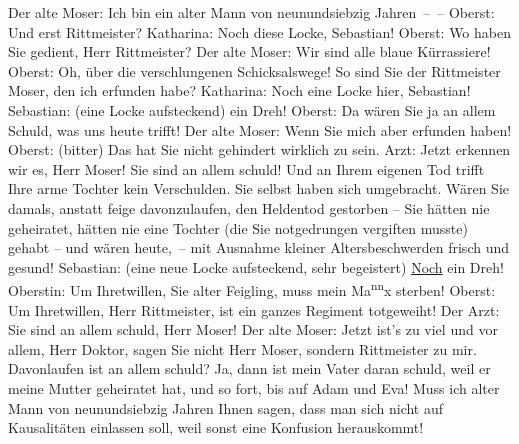 \begin{ledgroupsized}[t]{13cm}
           \pstart
           Der alte Moser: Ich bin ein alter Mann von neunundsiebzig Jahren – –\pend
           \pstart
           {\pb}Oberst: Und erst Rittmeister?\pend
           \pstart
           Katharina: Noch diese Locke, Sebastian!\pend
           \pstart
           Oberst: Wo haben Sie gedient, Herr Rittmeister?\pend
           \pstart
           Der alte Moser: Wir sind alle blaue Kürrassiere!\pend
           \pstart
           Oberst: Oh, über die verschlungenen Schicksalswege! So sind Sie der Rittmeister
               Moser, den ich erfunden habe?\pend
           \pstart
           Katharina: Noch eine Locke hier, Sebastian!\pend
           \pstart
           Sebastian: (eine Locke aufsteckend)  ein Dreh!\pend
           \pstart
           Oberst: Da wären Sie ja an allem Schuld, was uns heute trifft!\pend
           \pstart
           \introOben{}\introOben{}Der alte Moser: Wenn Sie mich aber erfunden haben!\pend
           \pstart
           Oberst: (bitter) Das hat Sie nicht gehindert wirklich zu sein.\pend
           \pstart
           Arzt: Jetzt erkennen wir es, Herr Moser! Sie sind an allem schuld! Und an Ihrem
               eigenen Tod trifft Ihre arme Tochter kein Verschulden. Sie selbst haben sich
               umgebracht. Wären Sie damals, anstatt feige davonzulaufen, den Heldentod gestorben –
               Sie hätten nie geheiratet, hätten nie eine Tochter (die Sie notgedrungen vergiften
               musste) gehabt – und wären heute, – mit Ausnahme kleiner Altersbeschwerden frisch und
               gesund!\pend
           \pstart
           Sebastian: (eine neue Locke aufsteckend, sehr begeistert) \uline{Noch} ein Dreh!\pend
           \pstart
           Oberstin: Um Ihretwillen, Sie alter Feigling, muss mein Ma\substVorne{}\textsuperscript{nn}\substDazwischen{}x\substHinten{} sterben!\pend
           \pstart
           Oberst: Um Ihretwillen, Herr Rittmeister, ist ein ganzes Regiment totgeweiht!\pend
           \pstart
           Der Arzt: Sie sind an allem schuld, Herr Moser!\pend
           \pstart
           Der alte Moser: Jetzt ist’s zu viel und vor allem, Herr Doktor, sagen Sie nicht Herr
               Moser, sondern Rittmeister zu mir.  Davonlaufen ist an
               allem schuld? Ja, {\pb}dann ist mein
               Vater daran schuld, weil er meine Mutter geheiratet hat, und so fort, bis auf Adam
               und Eva! Muss ich alter Mann von neunundsiebzig Jahren Ihnen sagen, dass man sich
               nicht auf Kausalitäten einlassen soll, weil sonst eine Konfusion herauskommt!\pend

\end{ledgroupsized}
